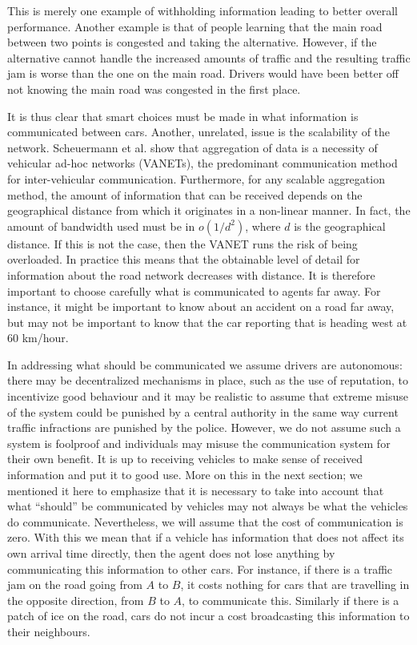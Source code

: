 \documentclass{article}
\begin{document}
This is merely one example of withholding information leading to better overall performance. Another example is that of people learning that the main road between two points is congested and taking the alternative. However, if the alternative cannot handle the increased amounts of traffic and the resulting traffic jam is worse than the one on the main road. Drivers would have been better off not knowing the main road was congested in the first place.

It is thus clear that smart choices must be made in what information is communicated between cars. Another, unrelated, issue is the scalability of the network. Scheuermann et al. \cite{Scheuermann2009} show that aggregation of data is a necessity of vehicular ad-hoc networks (VANETs), the predominant communication method for inter-vehicular communication. Furthermore, for any scalable aggregation method, the amount of information that can be received depends on the geographical distance from which it originates in a non-linear manner. In fact, the amount of bandwidth used must be in $o(1/d^2)$, where $d$ is the geographical distance. If this is not the case, then the VANET runs the risk of being overloaded. In practice this means that the obtainable level of detail for information about the road network decreases with distance. It is therefore important to choose carefully what is communicated to agents far away. For instance, it might be important to know about an accident on a road far away, but may not be important to know that the car reporting that is heading west at 60 km/hour.

In addressing what should be communicated we assume drivers are autonomous: there may be decentralized mechanisms in place, such as the use of reputation, to incentivize good behaviour and it may be realistic to assume that extreme misuse of the system could be punished by a central authority in the same way current traffic infractions are punished by the police. However, we do not assume such a system is foolproof and individuals may misuse the communication system for their own benefit. It is up to receiving vehicles to make sense of received information and put it to good use. More on this in the next section; we mentioned it here to emphasize that it is necessary to take into account that what ``should'' be communicated by vehicles may not always be what the vehicles do communicate. Nevertheless, we will assume that the cost of communication is zero. With this we mean that if a vehicle has information that does not affect its own arrival time directly, then the agent does not lose anything by communicating this information to other cars. For instance, if there is a traffic jam on the road going from $A$ to $B$, it costs nothing for cars that are travelling in the opposite direction, from $B$ to $A$, to communicate this. Similarly if there is a patch of ice on the road, cars do not incur a cost broadcasting this information to their neighbours. 
\end{document}
